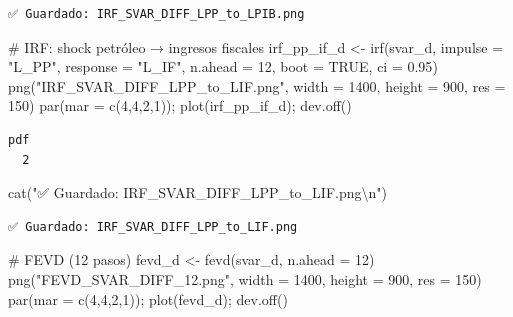 \documentclass[
  spanish,
  letterpaper,
  DIV=11,
  numbers=noendperiod]{scrartcl}
\newenvironment{Shaded}{\begin{snugshade}}{\end{snugshade}}
\newcommand{\AttributeTok}[1]{\textcolor[rgb]{0.40,0.45,0.13}{#1}}
\newcommand{\CommentTok}[1]{\textcolor[rgb]{0.37,0.37,0.37}{#1}}
\newcommand{\ConstantTok}[1]{\textcolor[rgb]{0.56,0.35,0.01}{#1}}
\newcommand{\DecValTok}[1]{\textcolor[rgb]{0.68,0.00,0.00}{#1}}
\newcommand{\FloatTok}[1]{\textcolor[rgb]{0.68,0.00,0.00}{#1}}
\newcommand{\FunctionTok}[1]{\textcolor[rgb]{0.28,0.35,0.67}{#1}}
\newcommand{\NormalTok}[1]{\textcolor[rgb]{0.00,0.23,0.31}{#1}}
\newcommand{\OtherTok}[1]{\textcolor[rgb]{0.00,0.23,0.31}{#1}}
\newcommand{\SpecialCharTok}[1]{\textcolor[rgb]{0.37,0.37,0.37}{#1}}
\newcommand{\StringTok}[1]{\textcolor[rgb]{0.13,0.47,0.30}{#1}}
\begin{document}
\begin{verbatim}
✅ Guardado: IRF_SVAR_DIFF_LPP_to_LPIB.png
\end{verbatim}

\begin{Shaded}
\begin{Highlighting}[]
\CommentTok{\# IRF: shock petróleo → ingresos fiscales}
\NormalTok{irf\_pp\_if\_d }\OtherTok{\textless{}{-}} \FunctionTok{irf}\NormalTok{(svar\_d, }\AttributeTok{impulse =} \StringTok{"L\_PP"}\NormalTok{, }\AttributeTok{response =} \StringTok{"L\_IF"}\NormalTok{,}
                   \AttributeTok{n.ahead =} \DecValTok{12}\NormalTok{, }\AttributeTok{boot =} \ConstantTok{TRUE}\NormalTok{, }\AttributeTok{ci =} \FloatTok{0.95}\NormalTok{)}
\FunctionTok{png}\NormalTok{(}\StringTok{"IRF\_SVAR\_DIFF\_LPP\_to\_LIF.png"}\NormalTok{, }\AttributeTok{width =} \DecValTok{1400}\NormalTok{, }\AttributeTok{height =} \DecValTok{900}\NormalTok{, }\AttributeTok{res =} \DecValTok{150}\NormalTok{)}
\FunctionTok{par}\NormalTok{(}\AttributeTok{mar =} \FunctionTok{c}\NormalTok{(}\DecValTok{4}\NormalTok{,}\DecValTok{4}\NormalTok{,}\DecValTok{2}\NormalTok{,}\DecValTok{1}\NormalTok{)); }\FunctionTok{plot}\NormalTok{(irf\_pp\_if\_d); }\FunctionTok{dev.off}\NormalTok{()}
\end{Highlighting}
\end{Shaded}

\begin{verbatim}
pdf 
  2 
\end{verbatim}

\begin{Shaded}
\begin{Highlighting}[]
\FunctionTok{cat}\NormalTok{(}\StringTok{"✅ Guardado: IRF\_SVAR\_DIFF\_LPP\_to\_LIF.png}\SpecialCharTok{\textbackslash{}n}\StringTok{"}\NormalTok{)}
\end{Highlighting}
\end{Shaded}

\begin{verbatim}
✅ Guardado: IRF_SVAR_DIFF_LPP_to_LIF.png
\end{verbatim}

\begin{Shaded}
\begin{Highlighting}[]
\CommentTok{\# FEVD (12 pasos)}
\NormalTok{fevd\_d }\OtherTok{\textless{}{-}} \FunctionTok{fevd}\NormalTok{(svar\_d, }\AttributeTok{n.ahead =} \DecValTok{12}\NormalTok{)}
\FunctionTok{png}\NormalTok{(}\StringTok{"FEVD\_SVAR\_DIFF\_12.png"}\NormalTok{, }\AttributeTok{width =} \DecValTok{1400}\NormalTok{, }\AttributeTok{height =} \DecValTok{900}\NormalTok{, }\AttributeTok{res =} \DecValTok{150}\NormalTok{)}
\FunctionTok{par}\NormalTok{(}\AttributeTok{mar =} \FunctionTok{c}\NormalTok{(}\DecValTok{4}\NormalTok{,}\DecValTok{4}\NormalTok{,}\DecValTok{2}\NormalTok{,}\DecValTok{1}\NormalTok{)); }\FunctionTok{plot}\NormalTok{(fevd\_d); }\FunctionTok{dev.off}\NormalTok{()}
\end{Highlighting}
\end{Shaded}
\end{document}
